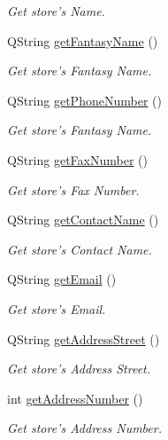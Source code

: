 \begin{DoxyCompactItemize}
\begin{DoxyCompactList}\small\item\em \-Get store's \-Name. \end{DoxyCompactList}\item 
\-Q\-String \hyperlink{class_store_a6285212a369cc8f4ac0f6b7c39d3aef6}{get\-Fantasy\-Name} ()
\begin{DoxyCompactList}\small\item\em \-Get store's \-Fantasy \-Name. \end{DoxyCompactList}\item 
\-Q\-String \hyperlink{class_store_a5b01352c0c75f39d7b98295d5bd0f365}{get\-Phone\-Number} ()
\begin{DoxyCompactList}\small\item\em \-Get store's \-Fantasy \-Name. \end{DoxyCompactList}\item 
\-Q\-String \hyperlink{class_store_a67ece73994016fcf23579caba1e5e04a}{get\-Fax\-Number} ()
\begin{DoxyCompactList}\small\item\em \-Get store's \-Fax \-Number. \end{DoxyCompactList}\item 
\-Q\-String \hyperlink{class_store_aa117f782a7dbe5e363c5e9626f6b11f6}{get\-Contact\-Name} ()
\begin{DoxyCompactList}\small\item\em \-Get store's \-Contact \-Name. \end{DoxyCompactList}\item 
\-Q\-String \hyperlink{class_store_a605e8043e59778f37a01f3f4f04eed5b}{get\-Email} ()
\begin{DoxyCompactList}\small\item\em \-Get store's \-Email. \end{DoxyCompactList}\item 
\-Q\-String \hyperlink{class_store_a7e7f457acbd777a458d2f975140645ed}{get\-Address\-Street} ()
\begin{DoxyCompactList}\small\item\em \-Get store's \-Address \-Street. \end{DoxyCompactList}\item 
int \hyperlink{class_store_af214fcae7192434b550d16c2ba234685}{get\-Address\-Number} ()
\begin{DoxyCompactList}\small\item\em \-Get store's \-Address \-Number. \end{DoxyCompactList}\item 

\end{DoxyCompactItemize}
